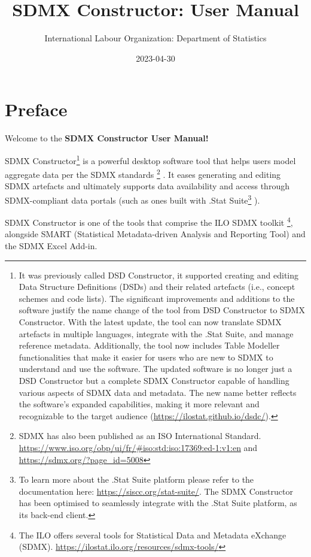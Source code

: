 \documentclass[
]{book}
\title{SDMX Constructor: User Manual}
\author{International Labour Organization: Department of Statistics}
\date{2023-04-30}
\begin{document}
\maketitle

{
\setcounter{tocdepth}{1}
\tableofcontents
}
\hypertarget{preface}{%
\chapter*{Preface}\label{preface}}

Welcome to the \textbf{SDMX Constructor User Manual!}

SDMX Constructor\footnote{It was previously called DSD Constructor, it supported creating and editing Data Structure Definitions (DSDs) and their related artefacts (i.e., concept schemes and code lists). The significant improvements and additions to the software justify the name change of the tool from DSD Constructor to SDMX Constructor. With the latest update, the tool can now translate SDMX artefacts in multiple languages, integrate with the .Stat Suite, and manage reference metadata. Additionally, the tool now includes Table Modeller functionalities that make it easier for users who are new to SDMX to understand and use the software. The updated software is no longer just a DSD Constructor but a complete SDMX Constructor capable of handling various aspects of SDMX data and metadata. The new name better reflects the software's expanded capabilities, making it more relevant and recognizable to the target audience (\url{https://ilostat.github.io/dsdc/}).} is a powerful desktop software tool that helps users model aggregate data per the SDMX standards \footnote{SDMX has also been published as an ISO International Standard. \url{https://www.iso.org/obp/ui/fr/\#iso:std:iso:17369:ed-1:v1:en} and \url{https://sdmx.org/?page_id=5008}} . It eases generating and editing SDMX artefacts and ultimately supports data availability and access through SDMX-compliant data portals (such as ones built with .Stat Suite\footnote{To learn more about the .Stat Suite platform please refer to the documentation here: \url{https://siscc.org/stat-suite/}. The SDMX Constructor has been optimised to seamlessly integrate with the .Stat Suite platform, as its back-end client.} ).

SDMX Constructor is one of the tools that comprise the ILO SDMX toolkit \footnote{The ILO offers several tools for Statistical Data and Metadata eXchange (SDMX). \url{https://ilostat.ilo.org/resources/sdmx-tools/}}, alongside SMART (Statistical Metadata-driven Analysis and Reporting Tool) and the SDMX Excel Add-in.
\end{document}
